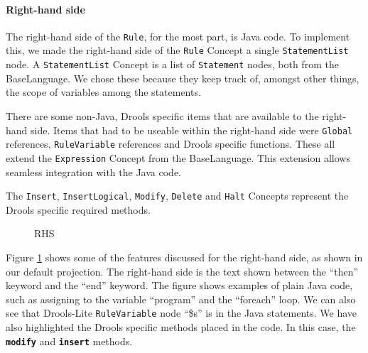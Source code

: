 \paragraph{Right-hand side} The right-hand side of the \texttt{Rule}, for the most part, is Java code.
To implement this, we made the right-hand side of the \texttt{Rule} Concept a single \texttt{StatementList} node.
A \texttt{StatementList} Concept is a list of \texttt{Statement} nodes, both from the BaseLanguage.
We chose these because they keep track of, amongst other things, the scope of variables among the statements.

There are some non-Java, Drools specific items that are available to the right-hand side.
Items that had to be useable within the right-hand side were \texttt{Global} references, \texttt{RuleVariable} references and Drools specific functions.
These all extend the \texttt{Expression} Concept from the BaseLanguage.
This extension allows seamless integration with the Java code.

The \texttt{Insert}, \texttt{InsertLogical}, \texttt{Modify}, \texttt{Delete} and \texttt{Halt} Concepts represent the Drools specific required methods.

\begin{figure}[H]
    \centering
    \caption{RHS}
    \label{fig:RHS}
\end{figure}

Figure \ref{fig:RHS} shows some of the features discussed for the right-hand side, as shown in our default projection.
The right-hand side is the text shown between the ``then'' keyword and the ``end'' keyword.
The figure shows examples of plain Java code, such as assigning to the variable ``program'' and the ``foreach'' loop.
We can also see that Drools-Lite \texttt{RuleVariable} node ``\$s'' is in the Java statements.
We have also highlighted the Drools specific methods placed in the code.
In this case, the \texttt{\textbf{modify}} and \texttt{\textbf{insert}} methods.

